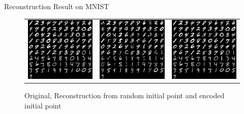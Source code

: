 \documentclass[10pt]{beamer}
\begin{document}
\begin{frame}{Reconstruction Result on MNIST}
\begin{figure}[H]
\centering
\hspace*{-1cm}
\begin{tabular}{ccc}
\includegraphics[width=1.5in]{reconstr_original.png} &
\includegraphics[width=1.5in]{reconstr_random_z.png} &
\includegraphics[width=1.5in]{reconstr_encoded.png}
\end{tabular}
\caption{Original, Reconstruction from random initial point and encoded initial point}
\end{figure}
\end{frame}
\end{document}
